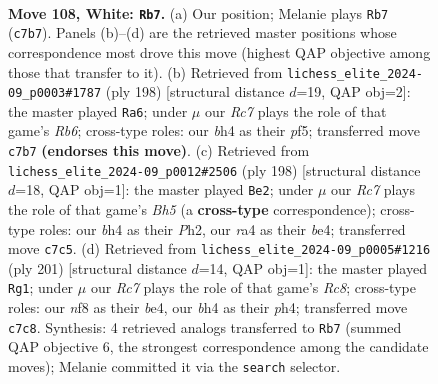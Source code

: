 \documentclass[11pt]{article}
\begin{document}
\clearpage

\begin{figure}[p]\centering
\begin{subfigure}{0.46\textwidth}\centering
\resizebox{\linewidth}{!}{%
\newchessgame
\chessboard[
  setfen={5n2/2R5/7p/4p3/r5kb/3p4/1K6/8 w - - 12 108},
  showmover=false,
  pgfstyle=straightmove, color=movearrow, markmove={c7-b7}
]}
\caption{}
\end{subfigure}\hfill
\begin{subfigure}{0.46\textwidth}\centering
\resizebox{\linewidth}{!}{%
\newchessgame
\chessboard[
  setfen={6r1/8/1R6/5p2/8/5pk1/8/5K2 w - - 56 100},
  showmover=false,
  pgfstyle=straightmove, color=movearrow, markmove={b6-a6}
]}
\caption{}
\end{subfigure}
\\[4pt]
\begin{subfigure}{0.46\textwidth}\centering
\resizebox{\linewidth}{!}{%
\newchessgame
\chessboard[
  setfen={8/8/8/p2k2pB/P3b3/2K5/7P/8 w - - 70 100},
  showmover=false,
  pgfstyle=straightmove, color=movearrow, markmove={h5-e2}
]}
\caption{}
\end{subfigure}\hfill
\begin{subfigure}{0.46\textwidth}\centering
\resizebox{\linewidth}{!}{%
\newchessgame
\chessboard[
  setfen={3k4/1R4P1/8/4K2p/4B2P/8/8/2r5 b - - 0 101},
  showmover=false,
  pgfstyle=straightmove, color=movearrow, markmove={c1-g1}
]}
\caption{}
\end{subfigure}
\caption{\textbf{Move 108, White: \texttt{Rb7}.} (a) Our position; Melanie plays \texttt{Rb7} (\texttt{c7b7}). Panels (b)--(d) are the retrieved master positions whose correspondence most drove this move (highest QAP objective among those that transfer to it). (b) Retrieved from \texttt{lichess\_elite\_2024-09\_p0003\#1787} (ply 198) [structural distance $d$=19, QAP obj=2]: the master played \texttt{Ra6}; under $\mu$ our \emph{Rc7} plays the role of that game's \emph{Rb6}; cross-type roles: our \emph{b}h4 as their \emph{p}f5; transferred move \texttt{c7b7} \textbf{(endorses this move)}. (c) Retrieved from \texttt{lichess\_elite\_2024-09\_p0012\#2506} (ply 198) [structural distance $d$=18, QAP obj=1]: the master played \texttt{Be2}; under $\mu$ our \emph{Rc7} plays the role of that game's \emph{Bh5} (a \textbf{cross-type} correspondence); cross-type roles: our \emph{b}h4 as their \emph{P}h2, our \emph{r}a4 as their \emph{b}e4; transferred move \texttt{c7c5}. (d) Retrieved from \texttt{lichess\_elite\_2024-09\_p0005\#1216} (ply 201) [structural distance $d$=14, QAP obj=1]: the master played \texttt{Rg1}; under $\mu$ our \emph{Rc7} plays the role of that game's \emph{Rc8}; cross-type roles: our \emph{n}f8 as their \emph{b}e4, our \emph{b}h4 as their \emph{p}h4; transferred move \texttt{c7c8}. Synthesis: 4 retrieved analogs transferred to \texttt{Rb7} (summed QAP objective 6, the strongest correspondence among the candidate moves); Melanie committed it via the \texttt{search} selector.}
\label{fig:thought-m214}
\end{figure}
\end{document}
